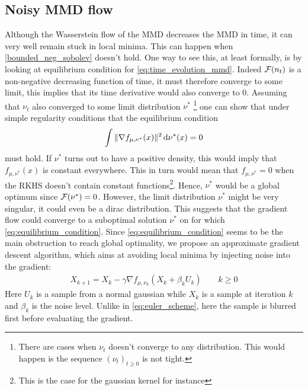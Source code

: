 

\subsection{Noisy MMD flow}

Although the Wasserstein flow of the MMD decreases the MMD in time, it can very well remain stuck in local minima. This can happen when \cref{bounded_neg_sobolev} doesn't hold. One way to see this, at least formally, is by looking at equilibrium condition for \cref{eq:time_evolution_mmd}.
Indeed ${{\mathcal F}}(n_t)$ is a non-negative decreasing function of time, it must therefore converge to some limit, this implies that its time derivative would also converge to $0$. Assuming that $\nu_t$ also converged to some limit distribution $\nu^{*}$
\footnote{There are cases when $\nu_t$ doesn't converge to any distribution. This would happen is the sequence $(\nu_t)_{t\geq 0}$ is not tight.} 
one can show that under simple regularity conditions that the equilibrium condition
\begin{align}\label{eq:equilibrium_condition}
	\int \Vert \nabla f_{\mu,\nu^{*}}(x)\Vert^2 \mathop{}\!\mathrm{d} \nu^{*}(x) =0  
\end{align}
must hold. If $\nu^*$ turns out to have a positive density, this would imply that $f_{\mu,\nu^{*}}(x)$ is constant everywhere. This in turn would mean that $f_{\mu,\nu^{*}}=0$ when the RKHS doesn't contain constant functions\footnote{This is the case for the gaussian kernel for instance}. Hence, $\nu^*$ would be a global optimum since ${{\mathcal F}}(\nu^{*})=0$. However, the limit distribution $\nu^*$  might be very singular, it could even be a dirac distribution.   This suggests that the gradient flow could converge to a suboptimal solution $\nu^*$ on for which \cref{eq:equilibrium_condition}. 
Since \cref{eq:equilibrium_condition} seems to be the main obstruction to reach global optimality, we propose an approximate gradient descent algorithm, which aims at avoiding local minima by injecting noise into the gradient:  
\begin{align}\label{eq:discretized_noisy_flow}
	X_{k+1} = X_{k} -\gamma \nabla f_{\mu,\nu_k}(X_k+ \beta_k U_k) \qquad k\geq 0
\end{align}
Here $U_k$ is a sample from a normal gaussian while $X_k$ is a sample at iteration $k$ and $\beta_k$ is the noise level. Unlike in \cref{eq:euler_scheme}, here the sample is blurred first before evaluating the gradient.
